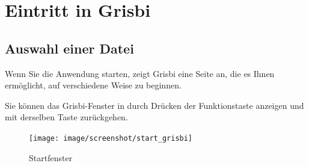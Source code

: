 
\chapter{Eintritt in Grisbi\label{entrance}}%

\section{Auswahl einer Datei\label{select-file}}%


Wenn Sie die Anwendung starten, zeigt Grisbi eine Seite an, die es Ihnen ermöglicht, auf verschiedene Weise zu beginnen.%


Sie können das Grisbi-Fenster in  durch Drücken der Funktionstaste  anzeigen und mit derselben Taste zurückgehen.%


\begin{figure}[htbp]			%
	\begin{center}					%
		\texttt{[image: image/screenshot/start\_grisbi]}		%
	\end{center}
	\caption{Startfenster}%
	\label{start_grisbi}					%
\end{figure}

